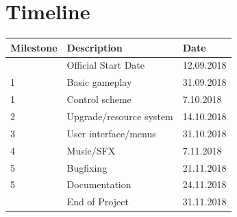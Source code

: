 \documentclass[a4paper]{scrreprt}
\begin{document}
\chapter{Timeline}
\begin{table}[h]
\centering
\begin{tabular}{|l|l|l|}
\hline
\textbf{Milestone} & \textbf{Description} & \textbf{Date} \\\hline
& Official Start Date & 12.09.2018 \\
1 & Basic gameplay & 31.09.2018 \\
1 & Control scheme & 7.10.2018 \\
2 & Upgrade/resource system  & 14.10.2018 \\
3 & User interface/menus &31.10.2018 \\
4 & Music/SFX & 7.11.2018 \\
5 & Bugfixing & 21.11.2018 \\
5 & Documentation & 24.11.2018 \\
& End of Project & 31.11.2018 \\
\hline
\end{tabular}
\end{table}
\end{document}
